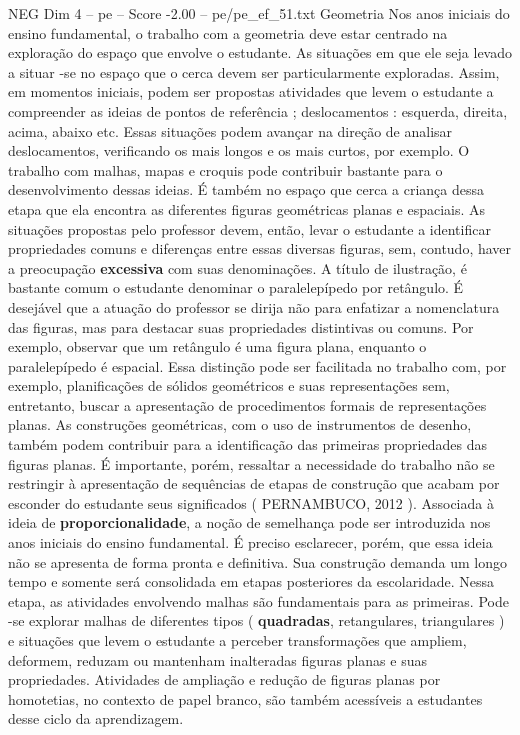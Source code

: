 \begin{textsample}{NEG Dim 4 – pe – Score -2.00 – pe/pe\_ef\_51.txt}  \label{ex:f4_neg_010}
Geometria Nos anos iniciais do ensino fundamental, o trabalho com a geometria deve estar centrado na exploração do espaço que envolve o estudante.
As situações em que ele seja levado a situar -se no espaço que o cerca devem ser particularmente exploradas.
Assim, em momentos iniciais, podem ser propostas atividades que levem o estudante a compreender as ideias de pontos de referência ; deslocamentos : esquerda, direita, acima, abaixo etc.
Essas situações podem avançar na direção de analisar deslocamentos, verificando os mais longos e os mais curtos, por exemplo.
O trabalho com malhas, mapas e croquis pode contribuir bastante para o desenvolvimento dessas ideias.
É também no espaço que cerca a criança dessa etapa que ela encontra as diferentes figuras geométricas planas e espaciais.
As situações propostas pelo professor devem, então, levar o estudante a identificar propriedades comuns e diferenças entre essas diversas figuras, sem, contudo, haver a preocupação \textbf{excessiva} com suas denominações.
A título de ilustração, é bastante comum o estudante denominar o paralelepípedo por retângulo.
É desejável que a atuação do professor se dirija não para enfatizar a nomenclatura das figuras, mas para destacar suas propriedades distintivas ou comuns.
Por exemplo, observar que um retângulo é uma figura plana, enquanto o paralelepípedo é espacial.
Essa distinção pode ser facilitada no trabalho com, por exemplo, planificações de sólidos geométricos e suas representações sem, entretanto, buscar a apresentação de procedimentos formais de representações planas.
As construções geométricas, com o uso de instrumentos de desenho, também podem contribuir para a identificação das primeiras propriedades das figuras planas.
É importante, porém, ressaltar a necessidade do trabalho não se restringir à apresentação de sequências de etapas de construção que acabam por esconder do estudante seus significados ( PERNAMBUCO, 2012 ).
Associada à ideia de \textbf{proporcionalidade}, a noção de semelhança pode ser introduzida nos anos iniciais do ensino fundamental.
É preciso esclarecer, porém, que essa ideia não se apresenta de forma pronta e definitiva.
Sua construção demanda um longo tempo e somente será consolidada em etapas posteriores da escolaridade.
Nessa etapa, as atividades envolvendo malhas são fundamentais para as primeiras.
Pode -se explorar malhas de diferentes tipos ( \textbf{quadradas}, retangulares, triangulares ) e situações que levem o estudante a perceber transformações que ampliem, deformem, reduzam ou mantenham inalteradas figuras planas e suas propriedades.
Atividades de ampliação e redução de figuras planas por homotetias, no contexto de papel branco, são também acessíveis a estudantes desse ciclo da aprendizagem.

\end{textsample}
